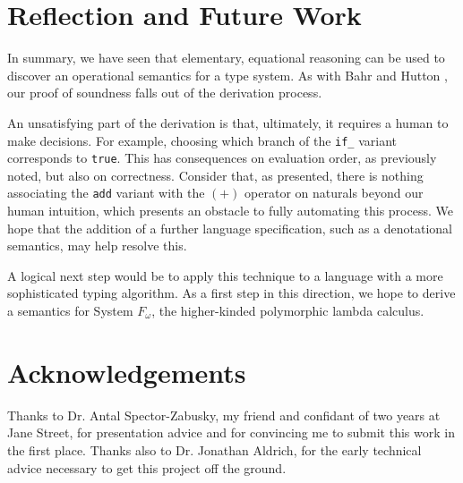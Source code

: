\documentclass[manuscript,screen,review,sigplan]{acmart}
\begin{document}
\section{Reflection and Future Work}

In summary, we have seen that elementary, equational reasoning can be used to
discover an operational semantics for a type system. As with Bahr and Hutton
\cite{bahr:2015}, our proof of soundness falls out of the derivation process.

An unsatisfying part of the derivation is that, ultimately, it requires a human
to make decisions. For example, choosing which branch of the \texttt{if\_}
variant corresponds to \texttt{true}. This has consequences on evaluation
order, as previously noted, but also on correctness. Consider that, as
presented, there is nothing associating the \texttt{add} variant with the $(+)$
operator on naturals beyond our human intuition, which presents an obstacle to
fully automating this process. We hope that the addition of a further language
specification, such as a denotational semantics, may help resolve this.

A logical next step would be to apply this technique to a language with a more
sophisticated typing algorithm. As a first step in this direction, we hope to
derive a semantics for System $F_{\omega}$, the higher-kinded polymorphic
lambda calculus.

\section*{Acknowledgements}

Thanks to Dr. Antal Spector-Zabusky, my friend and confidant of two years at
Jane Street, for presentation advice and for convincing me to submit this work
in the first place. Thanks also to Dr. Jonathan Aldrich, for the early technical
advice necessary to get this project off the ground.



\end{document}
